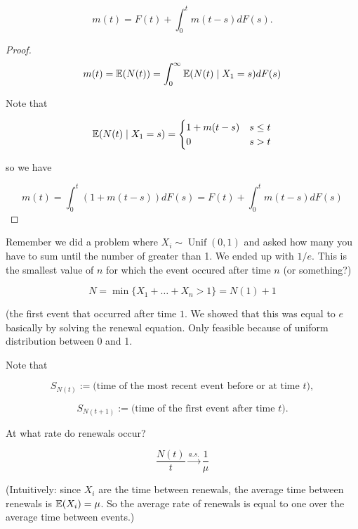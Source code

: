\begin{proposition}

\[
m(t)  = F(t) + \int_0^t m(t-s) dF(s).
\]

\end{proposition}

\begin{proof}

\[
m(t) = \E(N(t)) = \int_0^\infty \E(N(t) \mid X_1 =s) dF(s)
\]

Note that

\[
\E(N(t) \mid X_1 = s) = \begin{cases}
1 + m(t-s) & s \leq t \\
0 & s > t
\end{cases}
\]

so we have

\[
m(t) = \int_0^t (1 + m(t-s)) dF(s) = F(t) + \int_0^t m(t-s) dF(s)
\]

\end{proof}

\begin{remark} Remember we did a problem where \(X_i \sim \operatorname{Unif}(0,1)\) and asked how many you have to sum until the number of greater than 1. We ended up with \(1/e\). This is the smallest value of \(n\) for which the event occured after time \(n\) (or something?)

\[
N = \min \{X_1 + \ldots + X_n > 1\} = N(1) + 1
\]

(the first event that occurred after time \(1\). We showed that this was equal to \(e\) basically by solving the renewal equation. Only feasible because of uniform distribution between 0 and 1.

\end{remark}

\begin{remark} Note that

\[
S_{N(t)} := \text{(time of the most recent event before or at time } t) ,
\]

\[
S_{N(t+1)} :=  \text{(time of the first event after time } t) .
\]

\end{remark}

At what rate do renewals occur?

\begin{theorem}\label{stoch.strong.law.renew.proc}

\[
\frac{N(t)}{t} \xrightarrow{a.s.} \frac{1}{\mu}
\]

(Intuitively: since \(X_i\) are the time between renewals, the average time between renewals is \(\E(X_i) = \mu\). So the average rate of renewals is equal to one over the average time between events.) 

\end{theorem}

